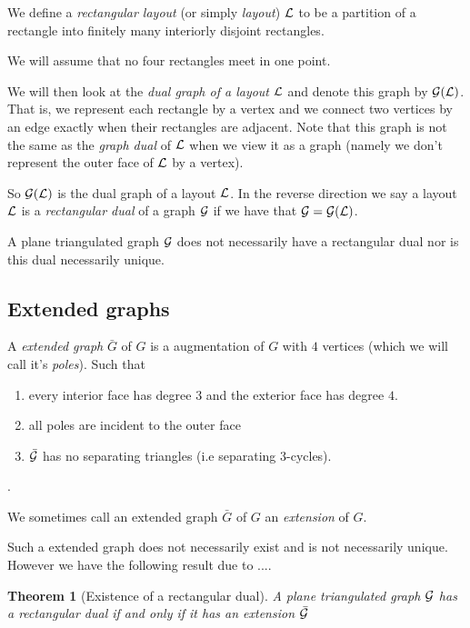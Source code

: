 \documentclass[a4paper]{article}
\newtheorem{thrm}{Theorem}
\theoremstyle{definition}
\newcommand{\ifftext}{if and only if }
\begin{document}
We define a \emph{rectangular layout} (or simply \emph{layout}) $\mathcal{L}$ to be a partition of a rectangle into finitely many interiorly disjoint rectangles. 

We will assume that no four rectangles meet in one point.

We will then look at the \emph{dual graph of a layout} $\mathcal{L}$ and denote this graph by $\mathcal{G}(\mathcal{L})$. That is, we represent each rectangle by a vertex and we connect two vertices by an edge exactly when their rectangles are adjacent. Note that this graph is not the same as the \emph{graph dual} of $\mathcal{L}$ when we view it as a graph (namely we don't represent the outer face of $\mathcal{L}$ by a vertex).

So $\mathcal{G}(\mathcal{L})$ is the dual graph of a layout $\mathcal{L}$. In the reverse direction we say a layout $\mathcal{L}$ is a \emph{rectangular dual} of a graph $\mathcal{G}$ if we have that $\mathcal{G} = \mathcal{G} (\mathcal{L})$.

A plane triangulated graph $\mathcal{G}$ does not necessarily have a rectangular dual nor is this dual necessarily unique.


\subsection{Extended graphs}
\newcommand{\ext}[1]{\bar{#1}}
A \emph{extended graph} $\ext G$ of $G$ is a augmentation of $G$ with $4$  vertices (which we will call it's \emph{poles}). Such that 
\begin{enumerate}
\item every interior face has degree $3$ and the exterior face has degree $4$.
\item all poles are incident to the outer face
\item $\ext\G$ has no separating triangles (i.e separating $3$-cycles).
\end{enumerate}.

We sometimes call an extended graph $\ext G$ of $G$ an \emph{extension} of $G$.

Such a extended graph does not necessarily exist and is not necessarily unique.  %
However we have the following result due to .... %

\begin{thrm}[Existence of a rectangular dual]
A plane triangulated graph $\mathcal{G}$ has a rectangular dual \ifftext it has an extension $\ext \G$
\end{thrm}
\end{document}
